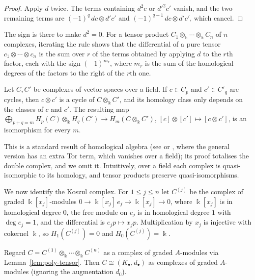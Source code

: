 \begin{advanced}
\begin{proof}
Apply $d$ twice.
The terms containing $d^2c$ or $d'^2c'$ vanish, and the two remaining terms are $(-1)^q\,dc\otimes d'c'$ and $(-1)^{q-1}\,dc\otimes d'c'$, which cancel.
\end{proof}

The sign is there to make $d^2=0$.
For a tensor product $C_1\otimes_\Bbbk\cdots\otimes_\Bbbk C_n$ of $n$ complexes, iterating the rule shows that the differential of a pure tensor $c_1\otimes\cdots\otimes c_n$ is the sum over $r$ of the terms obtained by applying $d$ to the $r$th factor, each with the sign $(-1)^{m_r}$, where $m_r$ is the sum of the homological degrees of the factors to the right of the $r$th one.

\begin{lemma}\label{lem:kunneth}
Let $C,C'$ be complexes of vector spaces over a field.
If $c\in C_p$ and $c'\in C'_q$ are cycles, then $c\otimes c'$ is a cycle of $C\otimes_\Bbbk C'$, and its homology class only depends on the classes of $c$ and $c'$.
The resulting map
$\bigoplus_{p+q=m}H_p(C)\otimes_\Bbbk H_q(C')\to H_m(C\otimes_\Bbbk C')$, $[c]\otimes[c']\mapsto[c\otimes c']$,
is an isomorphism for every $m$.
\end{lemma}

This is a standard result of homological algebra (see \cite[Section~3.6]{Wei94} or \cite[Chapter~V, Section~10]{ML95}, where the general version has an extra Tor term, which vanishes over a field); its proof totalises the double complex, and we omit it.
Intuitively, over a field each complex is quasi-isomorphic to its homology, and tensor products preserve quasi-isomorphisms.

We now identify the Koszul complex.
For $1\leq j\leq n$ let $C^{(j)}$ be the complex of graded $\Bbbk[x_j]$-modules $0\to\Bbbk[x_j]\,e_j\to\Bbbk[x_j]\to0$, where $\Bbbk[x_j]$ is in homological degree $0$, the free module on $e_j$ is in homological degree $1$ with $\deg e_j=1$, and the differential is $e_jp\mapsto x_jp$.
Multiplication by $x_j$ is injective with cokernel $\Bbbk$, so
$H_1(C^{(j)})=0$ and $H_0(C^{(j)})=\Bbbk$.

\begin{lemma}\label{lem:koszul-tensor}
Regard $C=C^{(1)}\otimes_\Bbbk\cdots\otimes_\Bbbk C^{(n)}$ as a complex of graded $A$-modules via Lemma~\ref{lem:poly-tensor}.
Then $C\cong(K_\bullet,d_\bullet)$ as complexes of graded $A$-modules (ignoring the augmentation $d_0$).
\end{lemma}


\end{advanced}
